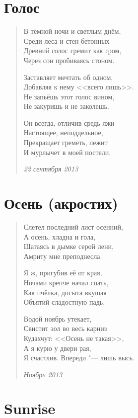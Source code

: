 \documentclass[a4paper,12pt]{article}
\newcommand{\ldotst}{\so{...}\xspace}
\begin{document}
\section{Голос}

\begin{verse}
В тёмной ночи и светлым днём,\\
Среди леса и стен бетонных\\
Древний голос гремит как гром,\\
Через сон пробиваясь стоном.

Заставляет мечтать об одном,\\
Добавляя к нему <<всего лишь>>.\\
Не запьёшь этот голос вином,\\
Не закуришь и не заколешь.

Он всегда, отличив средь лжи\\
Настоящее, неподдельное,\\
Прекращает греметь, лежит\\
И мурлычет в моей постели.

\emph{22 сентября 2013}
\end{verse}
\newpage

\section{Осень (акростих)}

\begin{verse}
Слетел последний лист осенний,\\
А осень, хладна и гола,\\
Шатаясь в дымке серой лени,\\
Амриту мне преподнесла.

Я ж, пригубив её от края,\\
Ночами крепче начал спать,\\
Как пчёлка, досыта вкушая\\
Объятий сладостную падь.

Водой ноябрь утекает,\\
Свистит эол во весь карниз\ldotst\\
Кудахчут: <<Осень не такая>>,\\
А я курю у двери рая,\\
Я счастлив. Впереди "--- лишь высь.

\emph{Ноябрь 2013}
\end{verse}
\newpage

\section{Sunrise}
\end{document}
